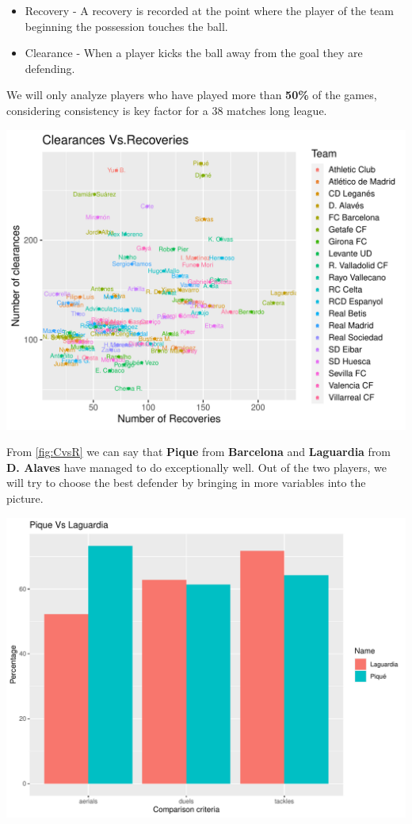 \documentclass[11pt,a4paper,]{article}
\let\origfigure\figure
\let\endorigfigure\endfigure
\renewenvironment{figure}[1][2] {
    \expandafter\origfigure\expandafter[H]
} {
    \endorigfigure
}
\begin{document}
\begin{itemize}
\item
  Recovery - A recovery is recorded at the point where the player of the team beginning the possession touches the ball.
\item
  Clearance - When a player kicks the ball away from the goal they are defending.
\end{itemize}

We will only analyze players who have played more than \textbf{50\%} of the games, considering consistency is key factor for a 38 matches long league.

\begin{figure}[H]

{\centering \includegraphics[width=0.8\linewidth]{Assignment-4-ETC5513_files/figure-latex/CvsR-1} 

}

\caption{Clearances vs Recoveries}\label{fig:CvsR}
\end{figure}

From \ref{fig:CvsR} we can say that \textbf{Pique} from \textbf{Barcelona} and \textbf{Laguardia} from \textbf{D. Alaves} have managed to do exceptionally well. Out of the two players, we will try to choose the best defender by bringing in more variables into the picture.

\begin{figure}[H]

{\centering \includegraphics[width=0.8\linewidth]{Assignment-4-ETC5513_files/figure-latex/better1-1} 

}

\caption{Pique Vs Laguardia}\label{fig:better1}
\end{figure}
\end{document}
